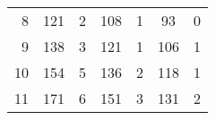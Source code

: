 \documentclass[authoryear]{tex/labreport}
\begin{document}
\begin{table}[htb]
\begin{tabular}{rcccccc}
    8                                & 121                                                                                         & 2                                                                                                                                                                                                 & 108                                                                                                      & 1                                                                                          & 93    & 0                                                                                                  \\
    9                                & 138                                                                                         & 3                                                                                                                                                                                                 & 121                                                                                                      & 1                                                                                          & 106   & 1                                                                                                 \\
    10                               & 154                                                                                         & 5                                                                                                                                                                                                 & 136                                                                                                      & 2                                                                                          & 118   & 1                                                                                                  \\
    11                               & 171                                                                                         & 6                                                                                                                                                                                                 & 151                                                                                                      & 3                                                                                          & 131   & 2                                                                                                  \\

\end{tabular}
\end{table}
\end{document}
